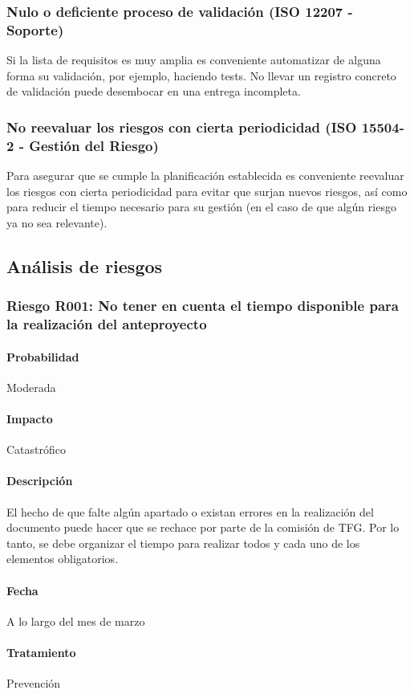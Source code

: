 \documentclass[10pt,a4paper]{article}
\begin{document}
			\subsubsection{Nulo o deficiente proceso de validación (ISO 12207 - Soporte)}
			Si la lista de requisitos es muy amplia es conveniente automatizar de alguna forma su validación, por ejemplo, haciendo tests. 
No llevar un registro concreto de validación puede desembocar en una entrega incompleta.
			\subsubsection{No reevaluar los riesgos con cierta periodicidad (ISO 15504-2 - Gestión del Riesgo)}
			Para asegurar que se cumple la planificación establecida es conveniente reevaluar los riesgos con cierta periodicidad para evitar que surjan nuevos riesgos, así como para reducir el tiempo necesario para su gestión (en el caso de que algún riesgo ya no sea relevante).
		\subsection{Análisis de riesgos}
			\subsubsection{Riesgo R001: No tener en cuenta el tiempo disponible para la realización del anteproyecto}
				\paragraph{Probabilidad} Moderada
				\paragraph{Impacto}	Catastrófico
				\paragraph{Descripción} El hecho de que falte algún apartado o existan errores en la realización del documento puede hacer que se rechace por parte de la comisión de TFG. Por lo tanto, se debe organizar el tiempo para realizar todos y cada uno de los elementos obligatorios.
				\paragraph{Fecha} A lo largo del mes de marzo %
				\paragraph{Tratamiento} Prevención %
\end{document}
